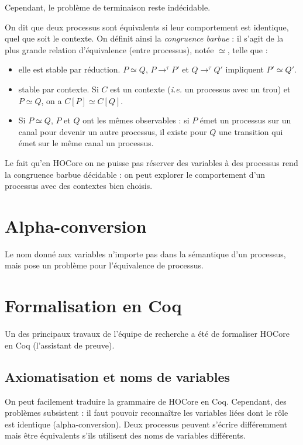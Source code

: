 \documentclass{article}
\def\barbue{\simeq}
\begin{document}
Cependant, le problème de terminaison reste indécidable.

On dit que deux processus sont équivalents si leur comportement est identique, quel que soit le contexte. On définit ainsi la \textit{congruence barbue} : il s'agit de la plus grande relation d'équivalence (entre processus), notée $\barbue$, telle que :
\begin{itemize}
\item elle est stable par réduction. $P\barbue Q$, $P\rightarrow^\tau P'$ et $Q\rightarrow^\tau Q'$ impliquent $P'\barbue Q'$.
\item stable par contexte. Si $C$ est un contexte (\textit{i.e.} un processus avec un trou) et $P\barbue Q$, on a $C[P]\barbue C[Q]$. 
\item Si $P\barbue Q$, $P$ et $Q$ ont les mêmes observables : si $P$ émet un processus sur un canal pour devenir un autre processus, il existe pour $Q$ une transition qui émet sur le même canal un processus.
\end{itemize}

Le fait qu'en HOCore on ne puisse pas réserver des variables à des processus rend la congruence barbue décidable : on peut explorer le comportement d'un processus avec des contextes bien choisis.

\section{Alpha-conversion}
Le nom donné aux variables n'importe pas dans la sémantique d'un processus, mais pose un problème pour l'équivalence de processus.


\section{Formalisation en Coq}
Un des principaux travaux de l'équipe de recherche a été de formaliser HOCore en Coq (l'assistant de preuve).

\subsection{Axiomatisation et noms de variables}
On peut facilement traduire la grammaire de HOCore en Coq. Cependant, des problèmes subsistent : il faut pouvoir reconnaître les variables liées dont le rôle est identique (alpha-conversion). Deux processus peuvent s'écrire différemment mais être équivalents s'ils utilisent des noms de variables différents. %
\end{document}
